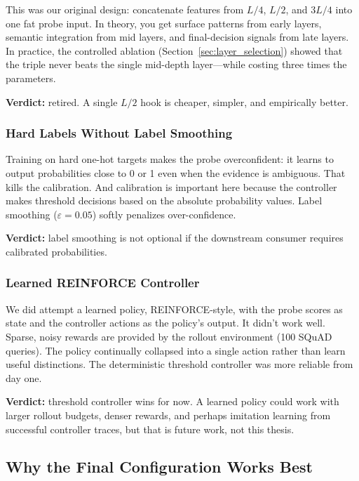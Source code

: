 This was our original design: concatenate features from $L/4$, $L/2$, and $3L/4$ into one fat probe input. In theory, you get surface patterns from early layers, semantic integration from mid layers, and final-decision signals from late layers. In practice, the controlled ablation (Section~\ref{sec:layer_selection}) showed that the triple never beats the single mid-depth layer—while costing three times the parameters.

\textbf{Verdict:} retired. A single $L/2$ hook is cheaper, simpler, and empirically better.

\subsubsection{Hard Labels Without Label Smoothing}

Training on hard one-hot targets makes the probe overconfident: it learns to output probabilities close to 0 or 1 even when the evidence is ambiguous. That kills the calibration. And calibration is important here because the controller makes threshold decisions based on the absolute probability values. Label smoothing ($\varepsilon = 0.05$) softly penalizes over-confidence.

\textbf{Verdict:} label smoothing is not optional if the downstream consumer requires calibrated probabilities.

\subsubsection{Learned REINFORCE Controller}

We did attempt a learned policy,  REINFORCE-style, with the probe scores as state and the controller actions as the policy's output. It didn't work well. Sparse, noisy rewards are provided by the rollout environment (100 SQuAD queries). The policy continually collapsed into a single action rather than learn useful distinctions. The deterministic threshold controller was more reliable from day one.

 \textbf{Verdict:} threshold controller wins for now. A learned policy could work with larger rollout budgets, denser rewards, and perhaps imitation learning from successful controller traces, but that is future work, not this thesis.

\subsection{Why the Final Configuration Works Best}
\label{subsec:why_best}

